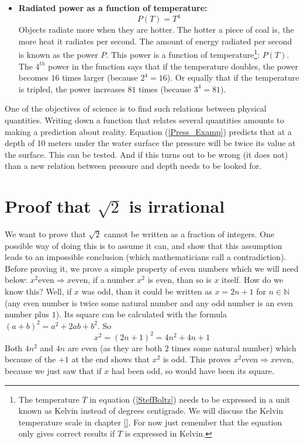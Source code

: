 \begin{itemize}
\item \textbf{Radiated power as a function of temperature: }
\begin{equation}
 P(T) = T^4
\label{StefBoltz}
\end{equation}
\noindent Objects radiate more when they are hotter. The hotter a piece of coal is, the more heat it radiates per second. The amount of energy radiated per second is known as the power $P$. This power is a function of temperature\footnote{The temperature $T$ in equation (\ref{StefBoltz}) needs to be expressed in a unit known as Kelvin instead of degrees centigrade. We will discuss the Kelvin temperature scale in chapter \ref{}. For now just remember that the equation only gives correct results if $T$ is expressed in Kelvin.}: $P(T)$. The $4^{th}$ power in the function says that if the temperature doubles, the power becomes $16$ times larger (because $2^4 = 16$). Or equally that if the temperature is tripled, the power increases $81$ times (because $3^4 = 81$).
\end{itemize}
\noindent One of the objectives of science is to find such relations between physical quantities. Writing down a function that relates several quantities amounts to making a prediction about reality. Equation (\ref{Press_Examp}) predicts that at a depth of 10 meters under the water surface the pressure will be twice its value at the surface. This can be tested. And if this turns out to be wrong (it does not) than a new relation between pressure and depth needs to be looked for.

\section{Proof that $\sqrt{2}$ is irrational}
\label{proofsqrt2}
\noindent We want to prove that $\sqrt{2}$ cannot be written as a fraction of integers. One possible way of doing this is to assume it can, and show that this assumption leads to an impossible conclusion (which mathematicians call a contradiction).\\

\noindent Before proving it, we prove a simple property of even numbers which we will need below: $ x^2 \text{even} \Rightarrow x \text{even} $, if a number $x^2$ is even, than so is $x$ itself. How do we know this? Well, if $x$ was odd, than it could be written as $x= 2n + 1$ for $n \in \mathbb{N}$ (any even number is twice some natural number and any odd number is an even number plus $1$). Its square can be calculated with the formula $\left( a+b  \right)^2 = a^2 + 2ab+b^2$. So
$$
x^2 = \left( 2n + 1 \right)^2 = 4n^2 + 4n + 1
$$
Both $4n^2$ and $4n$ are even (as they are both $2$ times some natural number) which because of the $+1$ at the end shows that $x^2$ is odd. This proves $x^2 \text{even} \Rightarrow x \text{even}$, because we just saw that if $x$ had been odd, so would have been its square.\\

